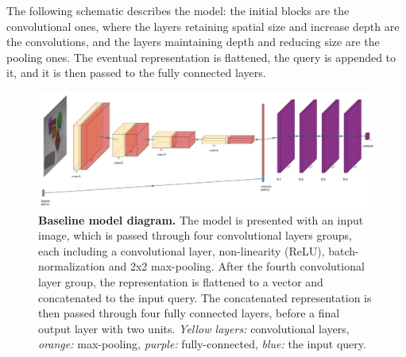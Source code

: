 The following schematic describes the model: the initial blocks are the convolutional ones, where the layers retaining spatial size and increase depth are the convolutions, and the layers maintaining depth and reducing size are the pooling ones. The eventual representation is flattened, the query is appended to it, and it is then passed to the fully connected layers.
\begin{figure}[!htb]
\centering
\includegraphics[width=\linewidth]{ch-models-compared/figures/baseline.pdf}
\caption[Baseline model diagram.]{{\bf Baseline model diagram.} The model is presented with an input image, which is passed through four convolutional layers groups, each including a convolutional layer, non-linearity (ReLU), batch-normalization and 2x2 max-pooling. After the fourth convolutional layer group, the representation is flattened to a vector and concatenated to the input query. The concatenated representation is then passed through four fully connected layers, before a final output layer with two units. \emph{Yellow layers:} convolutional layers, \emph{orange:} max-pooling, \emph{purple:} fully-connected, \emph{blue:} the input query.}
\label{fig:baseline-model-diagram}
\end{figure}

